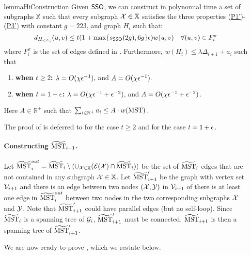\begin{restatable}{lemma}{HiConstruction}
	\label{lm:ConstructClusterHi} Given \hyperlink{SPHigh}{$\mathsf{SSO}$}, we can construct in polynomial time a set of subgraphs $\mathbb{X}$ such that every subgraph $\mathcal{X} \in \mathbb{X}$ satisfies the three properties (\hyperlink{P1'}{P1'})-(\hyperlink{P3'}{P3'}) with constant $g=223$, and graph $H_i$ such that:
		\begin{equation*}
			d_{H_{<L_i}}(u,v) \leq t(1+ \max\{s_{\mathsf{SSO}}(2g),6g\}\epsilon)w(u,v) \quad \forall (u,v)\in F^{\sigma}_{i}
		\end{equation*}
	 where $ F^{\sigma}_{i}$ is the set of edges defined in . Furthermore,  $w(H_i) \leq  \lambda \Delta_{i+1} + a_i$ such that
	\begin{enumerate}[noitemsep]
		\item \textbf{when $t \geq 2$:}  $\lambda = O(\chi \epsilon^{-1} )$, and $A = O(\chi \epsilon^{-1} )$.
		\item \textbf{when $t = 1+\epsilon$:} $\lambda = O(\chi \epsilon^{-1} + \epsilon^{-2})$, and $A = O(\chi \epsilon^{-1} + \epsilon^{-2})$. 
	\end{enumerate}
Here  $A \in \mathbb{R}^+$ such that $\sum_{i\in \mathbb{N}^+}a_i \leq A \cdot w(\mathrm{MST})$.
\end{restatable}

The proof of  is deferred to  for the case $t\geq 2$ and   for the case $t = 1+\epsilon$.   

\paragraph{Constructing $\widetilde{\mathrm{MST}}_{i+1}$.~}\hypertarget{MSTiPlus1}{}  Let $\widetilde{\mathrm{MST}}^{out}_{i} = \widetilde{\mathrm{MST}}_{i}\setminus (\cup_{\mathcal{X} \in \mathbb{X}}(\mathcal{E}(\mathcal{X})\cap \widetilde{\mathrm{MST}}_{i}))$ be the set of $\widetilde{\mathrm{MST}}_{i}$ edges that are not contained in any subgraph $\mathcal{X} \in \mathbb{X}$. Let $\widetilde{\mathrm{MST}}_{i+1}'$ be the graph with vertex set $\mathcal{V}_{i+1}$ and there is an edge between two nodes $(\mathcal{X},\mathcal{Y})$ in $\mathcal{V}_{i+1}$ of there is at least one edge in $\widetilde{\mathrm{MST}}^{out}_{i}$ between two nodes in the two corresponding subgraphs $\mathcal{X}$ and $\mathcal{Y}$. Note that $\widetilde{\mathrm{MST}}_{i+1}'$ could have parallel edges (but no self-loop).  Since $\widetilde{\mathrm{MST}}_{i}$ is  a spanning tree of $\mathcal{G}_i$, $\widetilde{\mathrm{MST}}_{i+1}'$ must be connected. $\widetilde{\mathrm{MST}}_{i+1}$ is then a spanning tree of $\widetilde{\mathrm{MST}}_{i+1}'$.


We are now ready to prove , which we restate below.

